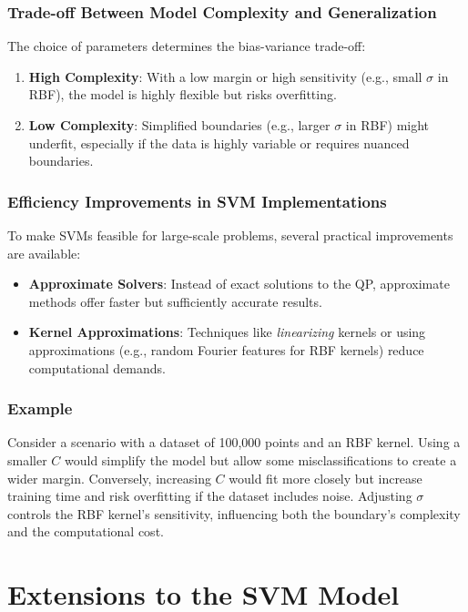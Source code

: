 \documentclass{article}
\begin{document}
\subsubsection*{Trade-off Between Model Complexity and Generalization}
The choice of parameters determines the bias-variance trade-off:
\begin{enumerate}
    \item \textbf{High Complexity}: With a low margin or high sensitivity (e.g., small \( \sigma \) in RBF), the model is highly flexible but risks overfitting.
    \item \textbf{Low Complexity}: Simplified boundaries (e.g., larger \( \sigma \) in RBF) might underfit, especially if the data is highly variable or requires nuanced boundaries.
\end{enumerate}

\subsubsection*{Efficiency Improvements in SVM Implementations}
To make SVMs feasible for large-scale problems, several practical improvements are available:
\begin{itemize}
    \item \textbf{Approximate Solvers}: Instead of exact solutions to the QP, approximate methods offer faster but sufficiently accurate results.
    \item \textbf{Kernel Approximations}: Techniques like \emph{linearizing} kernels or using approximations (e.g., random Fourier features for RBF kernels) reduce computational demands.
\end{itemize}

\subsubsection*{Example}
Consider a scenario with a dataset of 100,000 points and an RBF kernel. Using a smaller \( C \) would simplify the model but allow some misclassifications to create a wider margin. Conversely, increasing \( C \) would fit more closely but increase training time and risk overfitting if the dataset includes noise. Adjusting \( \sigma \) controls the RBF kernel’s sensitivity, influencing both the boundary’s complexity and the computational cost.

\section{Extensions to the SVM Model}
\end{document}
